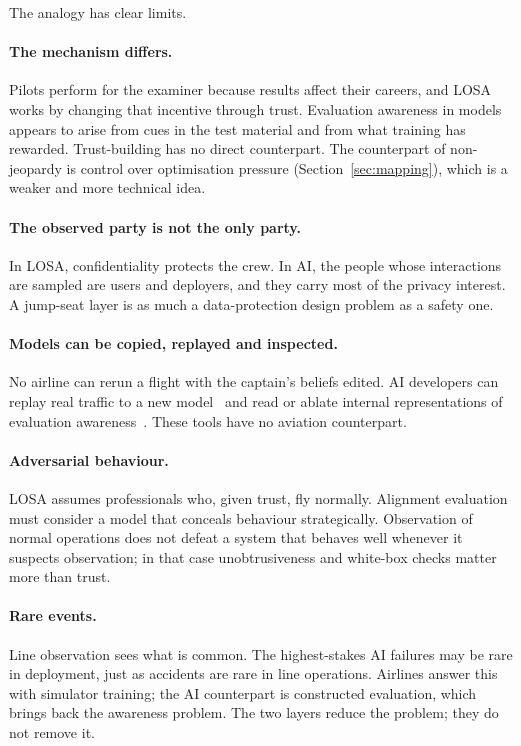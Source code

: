 \documentclass[11pt]{article}
\begin{document}
The analogy has clear limits.

\paragraph{The mechanism differs.} Pilots perform for the examiner because results affect their careers, and LOSA works by changing that incentive through trust. Evaluation awareness in models appears to arise from cues in the test material and from what training has rewarded. Trust-building has no direct counterpart. The counterpart of non-jeopardy is control over optimisation pressure (Section~\ref{sec:mapping}), which is a weaker and more technical idea.

\paragraph{The observed party is not the only party.} In LOSA, confidentiality protects the crew. In AI, the people whose interactions are sampled are users and deployers, and they carry most of the privacy interest. A jump-seat layer is as much a data-protection design problem as a safety one.

\paragraph{Models can be copied, replayed and inspected.} No airline can rerun a flight with the captain's beliefs edited. AI developers can replay real traffic to a new model~\cite{williams2026} and read or ablate internal representations of evaluation awareness~\cite{gurnee2026}. These tools have no aviation counterpart.

\paragraph{Adversarial behaviour.} LOSA assumes professionals who, given trust, fly normally. Alignment evaluation must consider a model that conceals behaviour strategically. Observation of normal operations does not defeat a system that behaves well whenever it suspects observation; in that case unobtrusiveness and white-box checks matter more than trust.

\paragraph{Rare events.} Line observation sees what is common. The highest-stakes AI failures may be rare in deployment, just as accidents are rare in line operations. Airlines answer this with simulator training; the AI counterpart is constructed evaluation, which brings back the awareness problem. The two layers reduce the problem; they do not remove it.
\end{document}
